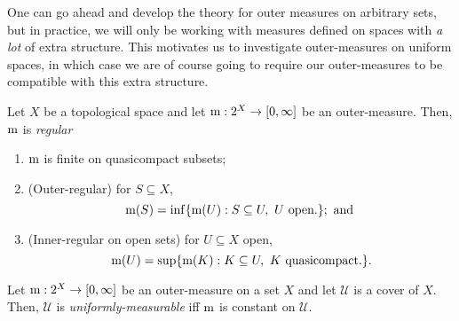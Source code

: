 One can go ahead and develop the theory for outer measures on arbitrary sets, but in practice, we will only be working with measures defined on spaces with \emph{a lot} of extra structure.  This motivates us to investigate outer-measures on uniform spaces, in which case we are of course going to require our outer-measures to be compatible with this extra structure.
\begin{dfn}\label{RegularMeasure}
Let $X$ be a topological space and let $\mathrm{m} :2^X\rightarrow [0,\infty ]$ be an outer-measure.  Then, $\mathrm{m}$ is \emph{regular}
\begin{enumerate}
\item $\mathrm{m}$ is finite on quasicompact subsets;
\item (Outer-regular) for $S\subseteq X$,
\begin{equation}
\meas (S)=\inf \{ \meas (U):S\subseteq U,\ U\text{ open.}\} ;\text{ and }
\end{equation}
\item (Inner-regular on open sets) for $U\subseteq X$ open,
\begin{equation}
\mathrm{m} (U)=\sup \{ \mathrm{m} (K):K\subseteq U,\ K\text{ quasicompact.}\} .
\end{equation}
\end{enumerate}
\end{dfn}
\begin{dfn}\label{UniformlyMeasurable}
Let $\mathrm{m} :2^X\rightarrow [0,\infty ]$ be an outer-measure on a set $X$ and let $\mathcal{U}$ is a cover of $X$.  Then, $\mathcal{U}$ is \emph{uniformly-measurable} iff $\mathrm{m}$ is constant on $\mathcal{U}$.
\end{dfn}
